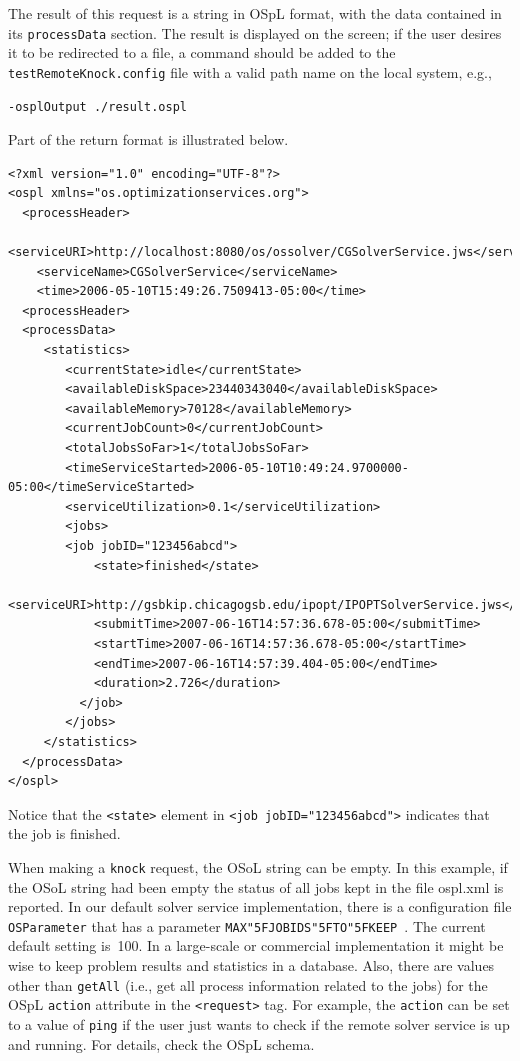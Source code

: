 \documentclass[11pt]{article}
\renewcommand{\_}{{\char"5F}}
\renewcommand{\{}{{\char"7B}}
\renewcommand{\}}{{\char"7D}}
\renewcommand{\^}{{\char"0D}}
\renewcommand{\'}{{\char"0D}}
\begin{document}
\begin{enumerate}[Step 1:]
The result of this request is a string in OSpL format, with the data contained in its
{\tt processData} section.  The result is displayed on the screen; if the user desires it
to be redirected to a file, a command should be added to the {\tt testRemoteKnock.config}
file with a valid path name on the local system, e.g.,

\begin{verbatim}
-osplOutput ./result.ospl
\end{verbatim}

Part of the return format is illustrated below.

\begin{verbatim}
<?xml version="1.0" encoding="UTF-8"?>
<ospl xmlns="os.optimizationservices.org">
  <processHeader>
    <serviceURI>http://localhost:8080/os/ossolver/CGSolverService.jws</serviceURI>
    <serviceName>CGSolverService</serviceName>
    <time>2006-05-10T15:49:26.7509413-05:00</time>
  <processHeader>
  <processData>
     <statistics>
        <currentState>idle</currentState>
        <availableDiskSpace>23440343040</availableDiskSpace>
        <availableMemory>70128</availableMemory>
        <currentJobCount>0</currentJobCount>
        <totalJobsSoFar>1</totalJobsSoFar>
        <timeServiceStarted>2006-05-10T10:49:24.9700000-05:00</timeServiceStarted>
        <serviceUtilization>0.1</serviceUtilization>
        <jobs>
        <job jobID="123456abcd">
            <state>finished</state>
            <serviceURI>http://gsbkip.chicagogsb.edu/ipopt/IPOPTSolverService.jws</serviceURI>
            <submitTime>2007-06-16T14:57:36.678-05:00</submitTime>
            <startTime>2007-06-16T14:57:36.678-05:00</startTime>
            <endTime>2007-06-16T14:57:39.404-05:00</endTime>
            <duration>2.726</duration>
          </job>
        </jobs>
     </statistics>
  </processData>
</ospl>
\end{verbatim}
Notice that the {\tt <state>} element in {\tt <job jobID="123456abcd">} indicates that the job is finished.

When making a {\tt knock} request,  the OSoL string can be empty. In this example, if the OSoL string had been empty
the status of all jobs kept in the file ospl.xml is reported.  In our default solver service implementation,
there is a configuration file {\tt OSParameter} that has a parameter {\tt MAX\_JOBIDS\_TO\_KEEP }.
The current default setting is~100. In a large-scale or commercial implementation it might be wise to keep
problem results and statistics in a database. Also, there are values other than {\tt getAll} (i.e., get all
process information related to the jobs) for the OSpL {\tt action} attribute in the {\tt <request>} tag.
For example, the {\tt action} can be set to a value of {\tt ping} if the user just wants
to check if the remote solver service is up and running. For details, check the OSpL schema.



\end{enumerate}
\end{document}
